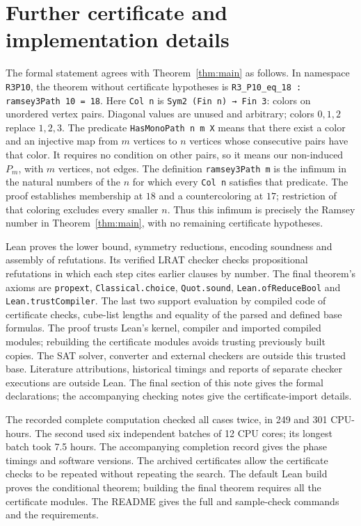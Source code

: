 \section{Further certificate and implementation details}
The formal statement agrees with Theorem~\ref{thm:main} as follows.
In namespace \texttt{R3P10}, the theorem without certificate hypotheses is
\texttt{R3\_P10\_eq\_18 : ramsey3Path 10 = 18}.
Here \texttt{Col n} is \texttt{Sym2 (Fin n) → Fin 3}: colors on unordered
vertex pairs. Diagonal values are unused and arbitrary; colors $0,1,2$
replace $1,2,3$. The predicate \texttt{HasMonoPath n m X} means that there
exist a color and an injective map from $m$ vertices to $n$ vertices whose
consecutive pairs have that color. It requires no condition on other
pairs, so it means our non-induced $P_m$, with $m$ vertices, not edges.
The definition \texttt{ramsey3Path m} is the infimum in the natural numbers
of the $n$ for which every \texttt{Col n} satisfies that predicate.
The proof establishes membership at $18$ and a countercoloring at $17$;
restriction of that coloring excludes every smaller $n$. Thus this
infimum is precisely the Ramsey number in Theorem~\ref{thm:main}, with
no remaining certificate hypotheses.

Lean proves the lower bound, symmetry reductions, encoding soundness and
assembly of refutations. Its verified LRAT checker checks propositional refutations in which each
step cites earlier clauses by number. The final theorem's axioms are
\texttt{propext}, \texttt{Classical.choice}, \texttt{Quot.sound},
\texttt{Lean.ofReduceBool} and \texttt{Lean.trustCompiler}.
The last two support evaluation by compiled code of certificate checks,
cube-list lengths and equality of the parsed and defined base formulas. The proof trusts Lean's kernel,
compiler and imported compiled modules; rebuilding the certificate modules
avoids trusting previously built copies. The SAT solver, converter and
external checkers are outside this trusted base. Literature attributions,
historical timings and reports of separate checker executions are outside
Lean. The final section of this note gives the formal declarations; the accompanying
checking notes give the certificate-import details.


The recorded complete computation checked all cases twice,
in 249 and 301 CPU-hours. The second used six independent batches of
12 CPU cores; its longest batch took 7.5 hours. The accompanying
completion record gives the phase timings and software versions. The
archived certificates \cite{Gra26} allow the certificate checks to be
repeated without repeating the search. The default Lean build proves
the conditional theorem; building the final theorem requires all the
certificate modules. The README gives the full and sample-check commands
and the requirements.




